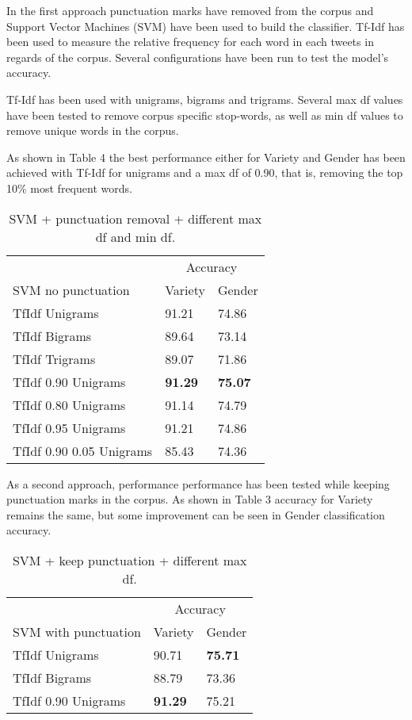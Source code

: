 \documentclass[11pt,a4paper]{article}
\begin{document}
In the first approach punctuation marks have removed from the corpus and Support Vector Machines (SVM) have been used to build the classifier. Tf-Idf has been used to measure the relative frequency for each word in each tweets in regards of the corpus. Several configurations have been run to test the model's accuracy.

Tf-Idf has been used with unigrams, bigrams and trigrams. Several max df values have been tested to remove corpus specific stop-words, as well as min df values to remove unique words in the corpus.

As shown in Table 4 the best performance either for Variety and Gender has been achieved with Tf-Idf for unigrams and a max df of 0.90, that is, removing the top 10\% most frequent words.

\begin{table}[htbp]
\begin{center}
\begin{tabular}{|l|l|l|}
\hline
& \multicolumn{2}{c|}{Accuracy} \\
\cline{2-3}
SVM no punctuation & Variety & Gender \\
\hline \hline
TfIdf Unigrams & 91.21 & 74.86 \\ \hline
TfIdf Bigrams & 89.64 & 73.14 \\ \hline
TfIdf Trigrams & 89.07 & 71.86 \\ \hline
TfIdf 0.90 Unigrams & \textbf{91.29} & \textbf{75.07} \\ \hline
TfIdf 0.80 Unigrams & 91.14 & 74.79 \\ \hline
TfIdf 0.95 Unigrams & 91.21 & 74.86 \\ \hline
TfIdf 0.90 0.05 Unigrams & 85.43 & 74.36 \\ \hline
\end{tabular}
\caption{SVM + punctuation removal + different max df and min df.}
\label{tabla:sencilla}
\end{center}
\end{table}

As a second approach, performance performance has been tested while keeping punctuation marks in the corpus. As shown in Table 3 accuracy for Variety remains the same, but some improvement can be seen in Gender classification accuracy.

\begin{table}[htbp]
\begin{center}
\begin{tabular}{|l|l|l|}
\hline
& \multicolumn{2}{c|}{Accuracy} \\
\cline{2-3}
SVM with punctuation & Variety & Gender \\
\hline \hline
TfIdf Unigrams & 90.71 & \textbf{75.71} \\ \hline
TfIdf Bigrams & 88.79 & 73.36 \\ \hline
TfIdf 0.90 Unigrams & \textbf{91.29} & 75.21 \\ \hline
\end{tabular}
\caption{SVM + keep punctuation + different max df.}
\label{tabla:sencilla}
\end{center}
\end{table}
\end{document}
